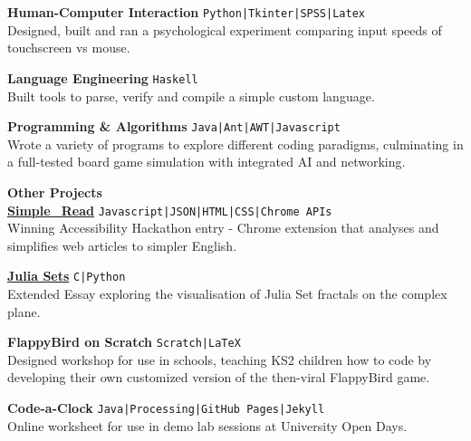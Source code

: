 \documentclass[10pt]{article}
\newcommand{\sect}[1]{{\LARGE{\textbf{#1}}}\vspace{0.1em}\\}
\newcommand{\zz}[3]{{\large\textbf{#1}} \hfill {\small \colorbox{boxcol}{\texttt{#3}} }\\{#2}\vspace{0.5em}}
\newcommand{\li}{\textcolor{linecol}{|}}
\begin{document}
\begin{minipage}[t]{0.66\textwidth}
\zz{Human-Computer Interaction}
{Designed, built and ran a psychological experiment comparing input speeds of touchscreen vs mouse.}{Python\li Tkinter\li SPSS\li Latex}

\zz{Language Engineering}
{Built tools to parse, verify and compile a simple custom language.}{Haskell}

\zz{Programming \& Algorithms}
{Wrote a variety of programs to explore different coding paradigms, culminating in a full-tested board game simulation with integrated AI and networking.}{Java\li Ant\li AWT\li Javascript}
\\




\vspace{0.5em}


\sect{Other Projects}
\zz{\href{https://github.com/LukeStorry/simple_read}{Simple\_Read}}
{Winning Accessibility Hackathon entry - Chrome extension that analyses and simplifies web articles to simpler English.}{Javascript\li JSON\li HTML\li CSS\li Chrome APIs}

\zz{\href{https://github.com/LukeStorry/Juliasets}{Julia Sets}}{Extended Essay exploring the visualisation of Julia Set fractals on the complex plane.}{C\li Python}

\zz{FlappyBird on Scratch}{Designed workshop for use in schools, teaching KS2 children how to code by developing their own customized version of the then-viral FlappyBird game.}{Scratch\li LaTeX}

\zz{Code-a-Clock}{Online worksheet for use in demo lab sessions at University Open Days.}{Java\li Processing\li GitHub Pages\li Jekyll}


\end{minipage} 
\end{document}
